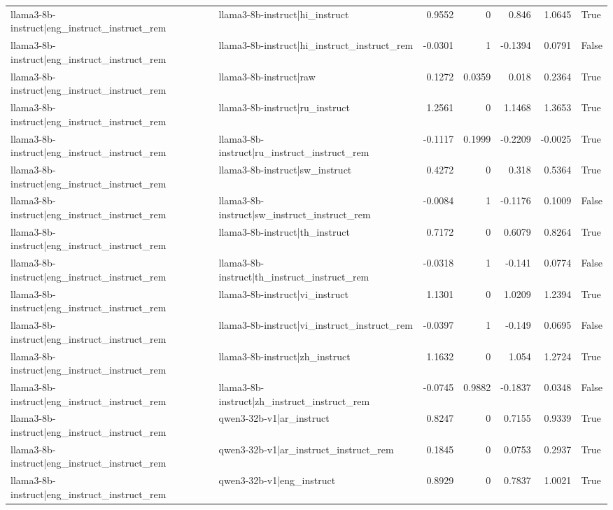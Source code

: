 \begin{table}
\begin{tabular}{l l r r r r l}
llama3-8b-instruct|eng_instruct_instruct_rem & llama3-8b-instruct|hi_instruct & 0.9552 & 0 & 0.846 & 1.0645 & True \\
llama3-8b-instruct|eng_instruct_instruct_rem & llama3-8b-instruct|hi_instruct_instruct_rem & -0.0301 & 1 & -0.1394 & 0.0791 & False \\
llama3-8b-instruct|eng_instruct_instruct_rem & llama3-8b-instruct|raw & 0.1272 & 0.0359 & 0.018 & 0.2364 & True \\
llama3-8b-instruct|eng_instruct_instruct_rem & llama3-8b-instruct|ru_instruct & 1.2561 & 0 & 1.1468 & 1.3653 & True \\
llama3-8b-instruct|eng_instruct_instruct_rem & llama3-8b-instruct|ru_instruct_instruct_rem & -0.1117 & 0.1999 & -0.2209 & -0.0025 & True \\
llama3-8b-instruct|eng_instruct_instruct_rem & llama3-8b-instruct|sw_instruct & 0.4272 & 0 & 0.318 & 0.5364 & True \\
llama3-8b-instruct|eng_instruct_instruct_rem & llama3-8b-instruct|sw_instruct_instruct_rem & -0.0084 & 1 & -0.1176 & 0.1009 & False \\
llama3-8b-instruct|eng_instruct_instruct_rem & llama3-8b-instruct|th_instruct & 0.7172 & 0 & 0.6079 & 0.8264 & True \\
llama3-8b-instruct|eng_instruct_instruct_rem & llama3-8b-instruct|th_instruct_instruct_rem & -0.0318 & 1 & -0.141 & 0.0774 & False \\
llama3-8b-instruct|eng_instruct_instruct_rem & llama3-8b-instruct|vi_instruct & 1.1301 & 0 & 1.0209 & 1.2394 & True \\
llama3-8b-instruct|eng_instruct_instruct_rem & llama3-8b-instruct|vi_instruct_instruct_rem & -0.0397 & 1 & -0.149 & 0.0695 & False \\
llama3-8b-instruct|eng_instruct_instruct_rem & llama3-8b-instruct|zh_instruct & 1.1632 & 0 & 1.054 & 1.2724 & True \\
llama3-8b-instruct|eng_instruct_instruct_rem & llama3-8b-instruct|zh_instruct_instruct_rem & -0.0745 & 0.9882 & -0.1837 & 0.0348 & False \\
llama3-8b-instruct|eng_instruct_instruct_rem & qwen3-32b-v1|ar_instruct & 0.8247 & 0 & 0.7155 & 0.9339 & True \\
llama3-8b-instruct|eng_instruct_instruct_rem & qwen3-32b-v1|ar_instruct_instruct_rem & 0.1845 & 0 & 0.0753 & 0.2937 & True \\
llama3-8b-instruct|eng_instruct_instruct_rem & qwen3-32b-v1|eng_instruct & 0.8929 & 0 & 0.7837 & 1.0021 & True \\

\end{tabular}
\end{table}
